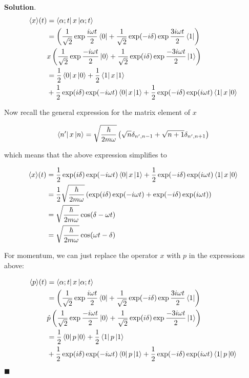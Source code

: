 \documentclass[12pt]{article}
\theoremstyle{definition}
\newenvironment{s}{%
        \begin{trivlist} \item \textbf{Solution}. }{%
            \hspace*{\fill} $\blacksquare$\end{trivlist}}%
\begin{document}
{\begin{s}
\begin{align*}
\langle x\rangle(t) &= \bra{\alpha;t}x\ket{\alpha;t}\\
&= \left(\frac{1}{\sqrt{2}}\exp\frac{i\omega t}{2}\bra{0} + \frac{1}{\sqrt{2}}\exp(-i\delta)\exp\frac{3i\omega t}{2}\bra{1}\right) \\
&x \left(\frac{1}{\sqrt{2}}\exp\frac{-i\omega t}{2}\ket{0} + \frac{1}{\sqrt{2}}\exp(i\delta)\exp\frac{-3i\omega t}{2}\ket{1}\right)\\
&= \frac{1}{2}\bra{0}x\ket{0} + \frac{1}{2}\bra{1}x\ket{1} \\
&+ \frac{1}{2}\exp(i\delta)\exp(-i\omega t)\bra{0}x\ket{1} + \frac{1}{2}\exp(-i\delta)\exp(i\omega t)\bra{1}x\ket{0}
\end{align*}

Now recall the general expression for the matrix element of $x$

\begin{align*}
\bra{n'}x\ket{n} = \sqrt{\frac{\hbar}{2m\omega}}\left(\sqrt{n}\delta_{n',n-1} +\sqrt{n+1}\delta_{n',n+1}\right)
\end{align*}

which means that the above expression simplifies to 

\begin{align*}
\langle x\rangle(t) &= \frac{1}{2}\exp(i\delta)\exp(-i\omega t)\bra{0}x\ket{1} + \frac{1}{2}\exp(-i\delta)\exp(i\omega t)\bra{1}x\ket{0}\\
&= \frac{1}{2}\sqrt{\frac{\hbar}{2m\omega}}\left(\exp(i\delta)\exp(-i\omega t)+\exp(-i\delta)\exp(i\omega t)\right)\\
&= \sqrt{\frac{\hbar}{2m\omega}}\cos(\delta-\omega t)\\
&= \sqrt{\frac{\hbar}{2m\omega}}\cos(\omega t-\delta)
\end{align*}

For momentum, we can just replace the operator $x$ with $p$ in the expressions above:

\begin{align*}
\langle p\rangle(t) &= \bra{\alpha;t}x\ket{\alpha;t}\\
&= \left(\frac{1}{\sqrt{2}}\exp\frac{i\omega t}{2}\bra{0} + \frac{1}{\sqrt{2}}\exp(-i\delta)\exp\frac{3i\omega t}{2}\bra{1}\right) \\
&\hat{p} \left(\frac{1}{\sqrt{2}}\exp\frac{-i\omega t}{2}\ket{0} + \frac{1}{\sqrt{2}}\exp(i\delta)\exp\frac{-3i\omega t}{2}\ket{1}\right)\\
&= \frac{1}{2}\bra{0}p\ket{0} + \frac{1}{2}\bra{1}p\ket{1} \\
&+ \frac{1}{2}\exp(i\delta)\exp(-i\omega t)\bra{0}p\ket{1} + \frac{1}{2}\exp(-i\delta)\exp(i\omega t)\bra{1}p\ket{0}
\end{align*}


\end{s}}
\end{document}
